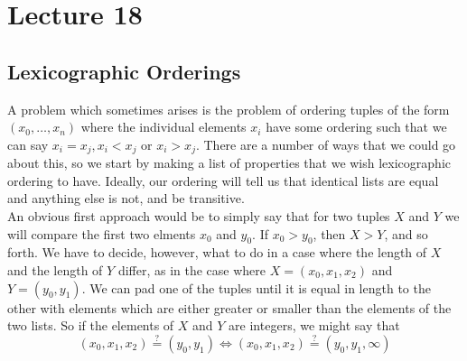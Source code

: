 \chapter{Lecture 18}

\section{Lexicographic Orderings}
A problem which sometimes arises is the problem of ordering tuples of the form $(x_0,\ldots,x_n)$ where the individual elements $x_i$ have some ordering such that we can say $x_i = x_j, x_i < x_j$ or $x_i > x_j$. There are a number of ways that we could go about this, so we start by making a list of properties that we wish lexicographic ordering to have. Ideally, our ordering will tell us that identical lists are equal and anything else is not, and be transitive.\\

An obvious first approach would be to simply say that for two tuples $X$ and $Y$ we will compare the first two elments $x_0$ and $y_0$. If $x_0 > y_0$, then $X > Y$, and so forth. We have to decide, however, what to do in a case where the length of $X$ and the length of $Y$ differ, as in the case where $X = (x_0,x_1,x_2)$ and $Y = (y_0,y_1)$. We can pad one of the tuples until it is equal in length to the other with elements which are either greater or smaller than the elements of the two lists. So if the elements of $X$ and $Y$ are integers, we might say that
\begin{equation*}
  (x_0,x_1,x_2) \stackrel{?}{=} (y_0,y_1) \Longleftrightarrow (x_0,x_1,x_2) \stackrel{?}{=} (y_0,y_1,\infty)
\end{equation*}

